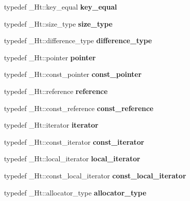 \begin{DoxyCompactItemize}
typedef \+\_\+\+Ht\+::key\+\_\+equal {\bfseries key\+\_\+equal}
\item 
\mbox{\label{classunordered__map_aedae4e68c2f9e06eca8bfe469d034770}} 
typedef \+\_\+\+Ht\+::size\+\_\+type {\bfseries size\+\_\+type}
\item 
\mbox{\label{classunordered__map_ae8359f5a85b77068051b147d10ec3e35}} 
typedef \+\_\+\+Ht\+::difference\+\_\+type {\bfseries difference\+\_\+type}
\item 
\mbox{\label{classunordered__map_a403aa94bdd15b43102be625671953742}} 
typedef \+\_\+\+Ht\+::pointer {\bfseries pointer}
\item 
\mbox{\label{classunordered__map_a7e1a731109920d2895d5ad05f4e4e266}} 
typedef \+\_\+\+Ht\+::const\+\_\+pointer {\bfseries const\+\_\+pointer}
\item 
\mbox{\label{classunordered__map_a163afede789c85c85182bd934043a267}} 
typedef \+\_\+\+Ht\+::reference {\bfseries reference}
\item 
\mbox{\label{classunordered__map_a0dfca562b4bb88d6672bc8cf2da02877}} 
typedef \+\_\+\+Ht\+::const\+\_\+reference {\bfseries const\+\_\+reference}
\item 
\mbox{\label{classunordered__map_a3be0c9c602bc3fae2289dfd989831c09}} 
typedef \+\_\+\+Ht\+::iterator {\bfseries iterator}
\item 
\mbox{\label{classunordered__map_af34e8cd0215e802458e2b7b5a0ebd12f}} 
typedef \+\_\+\+Ht\+::const\+\_\+iterator {\bfseries const\+\_\+iterator}
\item 
\mbox{\label{classunordered__map_aa4cee3c8e4bb6cf36750772e13976359}} 
typedef \+\_\+\+Ht\+::local\+\_\+iterator {\bfseries local\+\_\+iterator}
\item 
\mbox{\label{classunordered__map_acd7b8d658c53cea323c22daf3cb6227e}} 
typedef \+\_\+\+Ht\+::const\+\_\+local\+\_\+iterator {\bfseries const\+\_\+local\+\_\+iterator}
\item 
\mbox{\label{classunordered__map_ab7b1ee5fd9d6ed9af494713bb0135576}} 
typedef \+\_\+\+Ht\+::allocator\+\_\+type {\bfseries allocator\+\_\+type}
\end{DoxyCompactItemize}

